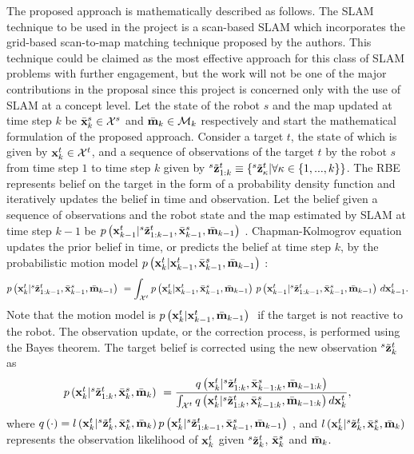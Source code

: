 \documentclass[letterpaper, 10 pt, conference]{ieeeconf}  %
\begin{document}
The proposed approach is mathematically described as follows.  The SLAM technique to be used in the project is a scan-based SLAM which incorporates the grid-based scan-to-map matching technique proposed by the authors.  This technique could be claimed as the most effective approach for this class of SLAM problems with further engagement, but the work will not be one of the major contributions in the proposal since this project is concerned only with the use of SLAM at a concept level.  Let the state of the robot $s$ and the map updated at time step $k$ be $\bar {\mathbf{x}}_{k}^{s} \in \mathcal{X}^s$ and $\bar {\mathbf{m}}_{k} \in \mathcal{M}_k$ respectively and start the mathematical formulation of the proposed approach.  Consider a target $t$, the state of which is given by $\mathbf{x}_{k}^{t} \in \mathcal{X}^t$, and a sequence of observations of the target $t$ by the robot $s$ from time step $1$ to time step $k$ given by ${}^{s}\tilde {\mathbf{z}}_{1:k}^{t} \equiv \left \{ {}^{s}\tilde {\mathbf{z}}_{\kappa}^{t}|\forall \kappa \in \left \{ 1,...,k \right \} \right \}$.  The RBE represents belief on the target in the form of a probability density function and iteratively updates the belief in time and observation.  Let the belief given a sequence of observations and the robot state and the map estimated by SLAM at time step $k-1$ be  $\mbox{$ {p} \left ( \mathbf{x}_{k-1}^{t}|{}^{s}\tilde {\mathbf{z}}_{1:k-1}^{t},\bar {\mathbf{x}}_{k-1}^{s},\bar {\mathbf{m}}_{k-1} \right )$ }$.  Chapman-Kolmogrov equation updates the prior belief in time, or predicts the belief at time step $k$, by the probabilistic motion model $\mbox{$ {p} \left ( \mathbf{x}_{k}^{t}|\mathbf{x}_{k-1}^{t},\bar {\mathbf{x}}_{k-1}^{s},\bar {\mathbf{m}}_{k-1} \right )$ }$: 
\begin{equation}\label{eq:predictT}
\mbox{$ {p} \left ( \mathbf{x}_{k}^{t}|{}^{s}\tilde {\mathbf{z}}_{1:k-1}^{t},\bar {\mathbf{x}}_{k-1}^{s},\bar {\mathbf{m}}_{k-1} \right )$ } = \int_{\mathcal{X}^t} \mbox{$ {p} \left ( \mathbf{x}_{k}^{t}|\mathbf{x}_{k-1}^{t},\bar {\mathbf{x}}_{k-1}^{s},\bar {\mathbf{m}}_{k-1} \right )$ } \mbox{$ {p} \left ( \mathbf{x}_{k-1}^{t}|{}^{s}\tilde {\mathbf{z}}_{1:k-1}^{t},\bar {\mathbf{x}}_{k-1}^{s},\bar {\mathbf{m}}_{k-1} \right )$ } d\mathbf{x}_{k-1}^{t}.
\end{equation}
Note that the motion model is $\mbox{$ {p} \left ( \mathbf{x}_{k}^{t}|\mathbf{x}_{k-1}^{t},\bar {\mathbf{m}}_{k-1} \right )$ }$ if the target is not reactive to the robot.  The observation update, or the correction process, is performed using the Bayes theorem.  The target belief is corrected using the new observation ${}^{s}\tilde {\mathbf{z}}_{k}^{t}$ as
\begin{eqnarray}\label{eq:correctT}
\mbox{$ {p} \left ( \mathbf{x}_{k}^{t}|{}^{s}\tilde {\mathbf{z}}_{1:k}^{t},\bar {\mathbf{x}}_{k}^{s},\bar {\mathbf{m}}_{k} \right )$ } = \frac{q \left ( \mathbf{x}_{k}^{t}|{}^{s}\tilde {\mathbf{z}}_{1:k}^{t},\bar {\mathbf{x}}_{k-1:k}^{s},\bar {\mathbf{m}}_{k-1:k} \right )} {\int_{\mathcal{X}^t}
	q \left ( \mathbf{x}_{k}^{t}|{}^{s}\tilde {\mathbf{z}}_{1:k}^{t},\bar {\mathbf{x}}_{k-1:k}^{s},\bar {\mathbf{m}}_{k-1:k} \right ) d\mathbf{x}_{k}^{t}},
\end{eqnarray}
where $q \left ( \cdot \right ) = {l \left ( \mathbf{x}_{k}^{t}|{}^{s}\tilde {\mathbf{z}}_{k}^{t},\bar {\mathbf{x}}_{k}^{s},\bar {\mathbf{m}}_{k} \right ) \mbox{$ {p} \left ( \mathbf{x}_{k}^{t}|{}^{s}\tilde {\mathbf{z}}_{1:k-1}^{t},\bar {\mathbf{x}}_{k-1}^{s},\bar {\mathbf{m}}_{k-1} \right )$ }}$, and $l \left ( \mathbf{x}_{k}^{t}|{}^{s}\tilde {\mathbf{z}}_{k}^{t},\bar {\mathbf{x}}_{k}^{s},\bar {\mathbf{m}}_{k} \right )$ represents the observation likelihood of $\mathbf{x}_{k}^{t}$ given ${}^{s}\tilde {\mathbf{z}}_{k}^{t}$, $\bar {\mathbf{x}}_{k}^{s}$ and $\bar {\mathbf{m}}_{k}$.  
\end{document}
